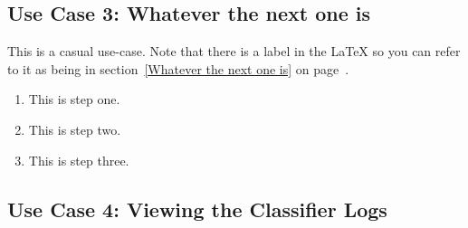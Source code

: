 \documentclass[12pt,oneside,letterpaper]{article}
\begin{document}
\subsection{\label{Whatever the next one is}Use Case 3: Whatever the next one is}
This is a casual use-case.  Note that there is a label in the LaTeX so you can refer
to it as being in section~\ref{Whatever the next one is} on page~\pageref{Whatever the next one is}.
\begin{enumerate}
\item This is step one.
\item This is step two.
\item This is step three.
\end{enumerate}


\subsection{\label{Upload Data Sets}Use Case 4: Viewing the Classifier Logs}
\end{document}
